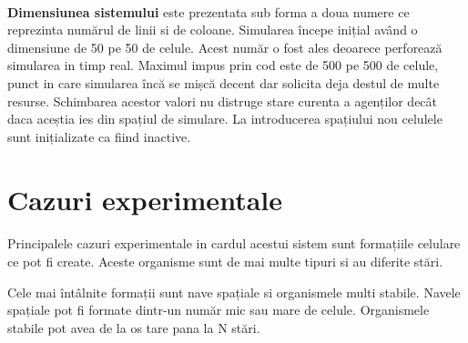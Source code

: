 \documentclass[11pt ,A4]{article}
\begin{document}
            
        \paragraph{}
            \textbf{Dimensiunea sistemului} este prezentata sub forma a doua numere ce reprezinta numărul de linii si de coloane.
            Simularea începe inițial având o dimensiune de 50 pe 50 de celule.
            Acest număr o fost ales deoarece perforează simularea in timp real.
            Maximul impus prin cod este de 500 pe 500 de celule, punct in care simularea încă se mișcă decent dar solicita deja destul de multe resurse.
            Schimbarea acestor valori nu distruge stare curenta a agenților decât daca aceștia ies din spațiul de simulare.
            La introducerea spațiului nou celulele sunt inițializate ca fiind inactive.

        

    \section{Cazuri experimentale}
        \paragraph{}
            Principalele cazuri experimentale in cardul acestui sistem sunt formațiile celulare ce pot fi create.
            Aceste organisme sunt de mai multe tipuri si au diferite stări.

            Cele mai întâlnite formații sunt nave spațiale si organismele multi stabile.
            Navele spațiale pot fi formate dintr-un număr mic sau mare de celule.
            Organismele stabile pot avea de la os tare pana la N stări.
\end{document}
